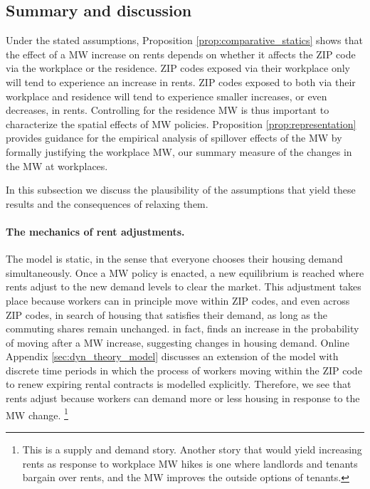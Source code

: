 \subsection{Summary and discussion}
\label{sec:model_summary}

Under the stated assumptions, Proposition \ref{prop:comparative_statics} shows 
that the effect of a MW increase on rents depends on whether it affects the 
ZIP code via the workplace or the residence.
ZIP codes exposed via their workplace only will tend to experience an 
increase in rents.
ZIP codes exposed to both via their workplace and residence will tend to 
experience smaller increases, or even decreases, in rents.
Controlling for the residence MW is thus important to characterize the spatial 
effects of MW policies.
Proposition \ref{prop:representation} provides guidance for the empirical
analysis of spillover effects of the MW by formally justifying the 
workplace MW, our summary measure of the changes in the MW at workplaces.

In this subsection we discuss the plausibility of the assumptions that yield 
these results and the consequences of relaxing them.

\paragraph{The mechanics of rent adjustments.}

The model is static, in the sense that everyone chooses their housing demand 
simultaneously.
Once a MW policy is enacted, a new equilibrium is reached where rents adjust
to the new demand levels to clear the market.
This adjustment takes place because workers can in principle move within ZIP 
codes, and even across ZIP codes, in search of housing that satisfies their 
demand, as long as the commuting shares remain unchanged.
in fact, \textcite{AgarwalEtAl2022} finds an increase in the probability of 
moving after a MW increase, suggesting changes in housing demand.
Online Appendix \ref{sec:dyn_theory_model} discusses an extension of the model
with discrete time periods in which the process of workers moving within the 
ZIP code to renew expiring rental contracts is modelled explicitly.
Therefore, we see that rents adjust because workers can demand more or less 
housing in response to the MW change.%
\footnote{This is a supply and demand story. 
    Another story that would yield increasing rents as response to workplace MW
    hikes is one where landlords and tenants bargain over rents, 
    and the MW improves the outside options of tenants.}

